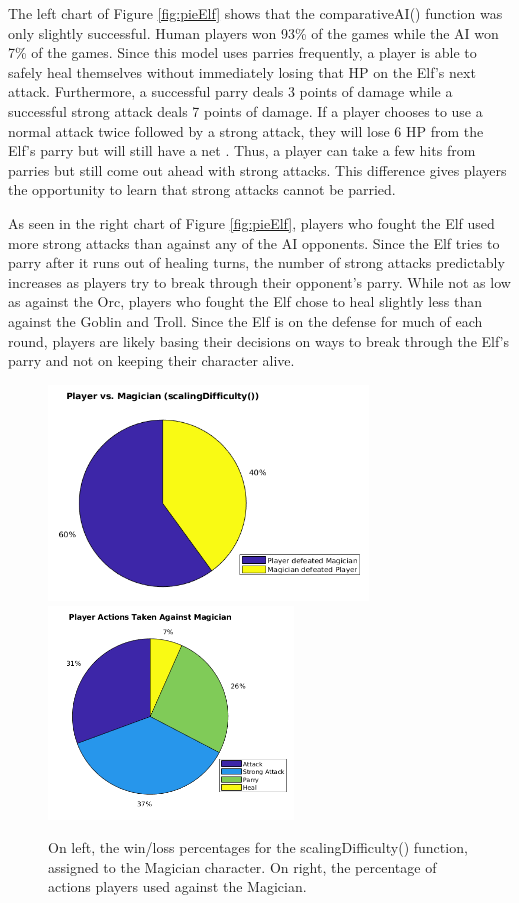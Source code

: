 The left chart of Figure \ref{fig:pieElf} shows that the comparativeAI() function was only slightly successful. Human players won 93\% of the games while the AI won 7\% of the games. Since this model uses parries frequently, a player is able to safely heal themselves without immediately losing that HP on the Elf's next attack. Furthermore, a successful parry deals 3 points of damage while a successful strong attack deals 7 points of damage. If a player chooses to use a normal attack twice followed by a strong attack, they will lose 6 HP from the Elf's parry but will still have a net . Thus, a player can take a few hits from parries but still come out ahead with strong attacks. This difference gives players the opportunity to learn that strong attacks cannot be parried.

As seen in the right chart of Figure \ref{fig:pieElf}, players who fought the Elf used more strong attacks than against any of the AI opponents. Since the Elf tries to parry after it runs out of healing turns, the number of strong attacks predictably increases as players try to break through their opponent's parry. While not as low as against the Orc, players who fought the Elf chose to heal slightly less than against the Goblin and Troll. Since the Elf is on the defense for much of each round, players are likely basing their decisions on ways to break through the Elf's parry and not on keeping their character alive.

\begin{figure}[H]
  \centering
  \includegraphics[width=8.5cm]{figures/magicianWins.png}
  \includegraphics[width=6.5cm]{figures/actionsMagician.png}
  \caption{On left, the win/loss percentages for the scalingDifficulty() function, assigned to the Magician character. On right, the percentage of actions players used against the Magician.}
  \label{fig:pieMagician}
\end{figure}

